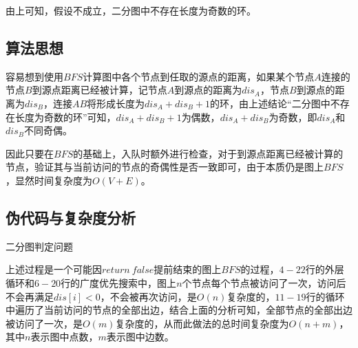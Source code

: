 \documentclass{article}
\begin{document}
由上可知，假设不成立，二分图中不存在长度为奇数的环。

\subsection{算法思想}

容易想到使用$BFS$计算图中各个节点到任取的源点的距离，如果某个节点$A$连接的节点$B$到源点距离已经被计算，记节点$A$到源点的距离为$dis_A$，节点$B$到源点的距离为$dis_B$，连接$AB$将形成长度为$dis_A+dis_B+1$的环，由上述结论“二分图中不存在长度为奇数的环”可知，$dis_A+dis_B+1$为偶数，$dis_A+dis_B$为奇数，即$dis_A$和$dis_B$不同奇偶。

因此只要在$BFS$的基础上，入队时额外进行检查，对于到源点距离已经被计算的节点，验证其与当前访问的节点的奇偶性是否一致即可，由于本质仍是图上$BFS$，显然时间复杂度为$O(V+E)$。

\subsection{伪代码与复杂度分析}

\begin{algorithm}[H]

\caption{二分图判定问题}
\LinesNumbered
{}


\end{algorithm}

上述过程是一个可能因$return\ false$提前结束的图上$BFS$的过程，$4-22$行的外层循环和$6-20$行的广度优先搜索中，图上$n$个节点每个节点被访问了一次，访问后不会再满足$dis[i]<0$，不会被再次访问，是$O(n)$复杂度的，$11-19$行的循环中遍历了当前访问的节点的全部出边，结合上面的分析可知，全部节点的全部出边被访问了一次，是$O(m)$复杂度的，从而此做法的总时间复杂度为$O(n+m)$，其中$n$表示图中点数，$m$表示图中边数。
\end{document}
